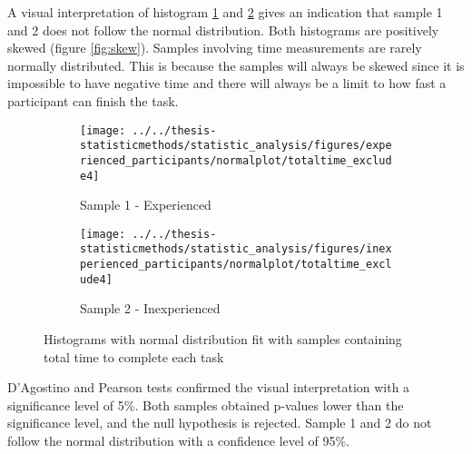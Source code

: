 A visual interpretation of histogram \ref{fig:totaltimeexclude4_experienced} and \ref{fig:totaltimeexclude4_inexperienced} gives an indication that sample 1 and 2 does not follow the normal distribution. Both histograms are positively skewed (figure \ref{fig:skew}). Samples involving time measurements are rarely normally distributed. This is because the samples will always be skewed since it is impossible to have negative time and there will always be a limit to how fast a participant can finish the task. 

\begin{figure}[H]
	\centering
	\begin{subfigure}[b]{0.48\textwidth}
		\centering
		\texttt{[image: ../../thesis-statisticmethods/statistic\_analysis/figures/experienced\_participants/normalplot/totaltime\_exclude4]}
		\caption{Sample 1 - Experienced}
		\label{fig:totaltimeexclude4_experienced}
	\end{subfigure}
	\begin{subfigure}[b]{0.48\textwidth}
		\centering
		\texttt{[image: ../../thesis-statisticmethods/statistic\_analysis/figures/inexperienced\_participants/normalplot/totaltime\_exclude4]}
		\caption{Sample 2 - Inexperienced}
		\label{fig:totaltimeexclude4_inexperienced}
	\end{subfigure}
\caption{Histograms with normal distribution fit with samples containing total time to complete each task}
\label{fig:sample1,2_histo_original}
\end{figure}

D'Agostino and Pearson tests confirmed the visual interpretation with a significance level of 5\%. Both samples obtained p-values lower than the significance level, and the null hypothesis is rejected. Sample 1 and 2 do not follow the normal distribution with a confidence level of 95\%. \\[0.5cm]

